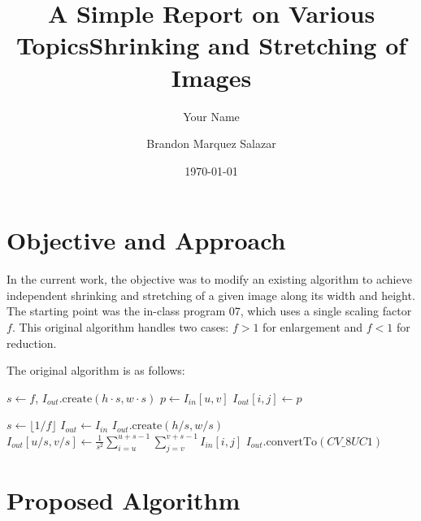 \documentclass[10pt]{article}
\title{A Simple Report on Various Topics}
\author{Your Name}
\date{\today} %
\title{Shrinking and Stretching of Images}
\author{Brandon Marquez Salazar}
\date{}
\begin{document}
\maketitle

\section{Objective and Approach}

In the current work, the objective was to modify an existing algorithm to achieve independent shrinking and stretching of a given image along its width and height. The starting point was the in-class program 07, which uses a single scaling factor $f$. This original algorithm handles two cases: $f > 1$ for enlargement and $f < 1$ for reduction.

The original algorithm is as follows:

\begin{algorithm}
\caption{Image Scaling (Escalar)}
\begin{algorithmic}[1]
     
        \State $s \gets f$, $I_{out}.\text{create}(h \cdot s, w \cdot s)$
        \For{$u \in [0,h)$}
            \For{$v \in [0,w)$}
                \State $p \gets I_{in}[u,v]$
                \For{$i \in [u \cdot s, (u+1) \cdot s)$}
                    \For{$j \in [v \cdot s, (v+1) \cdot s)$}
                        \State $I_{out}[i,j] \gets p$
                    \EndFor
                \EndFor
            \EndFor
        \EndFor
        
    \Else {}
        \State $s \gets \lfloor 1/f \rfloor$
            \State $I_{out} \gets I_{in}$ 
        \Else
            \State $I_{out}.\text{create}(h/s, w/s)$
            \For{$u \in [0,h)$ step $s$}
                \For{$v \in [0,w)$ step $s$}
                    \State $I_{out}[u/s,v/s] \gets \frac{1}{s^2} \sum_{i=u}^{u+s-1} \sum_{j=v}^{v+s-1} I_{in}[i,j]$
                \EndFor
            \EndFor
            \State {}
        \EndIf
    \EndIf
    \State $I_{out}.\text{convertTo}(CV\_8UC1)$
\EndProcedure
\end{algorithmic}
\end{algorithm}

\section{Proposed Algorithm}
\end{document}
